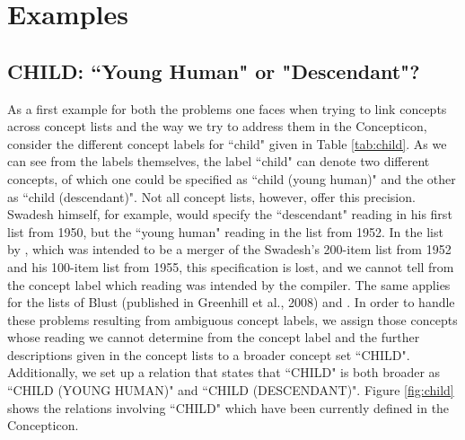 \documentclass[10pt, a4paper]{article}
\begin{document}
\section{Examples}
\subsection{CHILD: ``Young Human" or "Descendant"?}
As a first example for both the problems one faces when trying to link concepts across concept lists and the way we
try to address them in the Concepticon, consider the different concept labels for ``child" given in
Table \ref{tab:child}. As we can see from the labels themselves, the label ``child" can denote two
different concepts, of which one could be specified as ``child (young human)" and the other as
``child (descendant)". Not all concept lists, however, offer this precision. Swadesh himself, for
example, would specify the ``descendant" reading in his first list from 1950, but the ``young human"
reading in the list from 1952. In the list by , which was intended to be a merger of
the Swadesh's 200-item list from 1952 and his 100-item list from 1955, this specification is lost,
and we cannot tell from the concept label which reading was intended by the compiler. The same
applies for the lists of Blust (published in Greenhill et al., 2008) and .  In order to handle
these problems resulting from ambiguous concept labels, we assign those concepts whose reading we
cannot determine from the concept label and the further descriptions given in the concept lists to a
broader concept set ``CHILD". Additionally, we set up a relation that states that ``CHILD" is both
broader as ``CHILD (YOUNG HUMAN)" and ``CHILD (DESCENDANT)". Figure \ref{fig:child} shows the
relations involving ``CHILD" which have been currently defined in the Concepticon.
 
\end{document}
